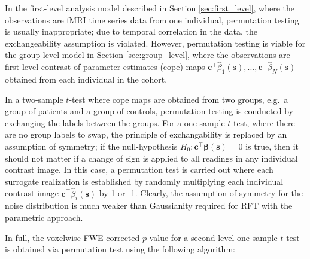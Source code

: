 In the first-level analysis model described in Section \ref{sec:first_level}, where the observations are fMRI time series data from one individual, permutation testing is usually inappropriate; due to temporal correlation in the data, the exchangeability assumption is violated. However, permutation testing is viable for the group-level model in Section \ref{sec:group_level}, where the observations are first-level contrast of parameter estimates (cope) maps $\bm{c}^{\intercal}\hat{\beta}_{1}(\bm{s}), ..., \bm{c}^{\intercal}\hat{\beta}_{N}(\bm{s})$ obtained from each individual in the cohort.

In a two-sample $t$-test where cope maps are obtained from two groups, e.g.\ a group of patients and a group of controls, permutation testing is conducted by exchanging the labels between the groups. For a one-sample $t$-test, where there are no group labels to swap, the principle of exchangability is replaced by an assumption of symmetry; if the null-hypothesis $H_{0} : \bm{c}^{\intercal}\bm{\beta}(\bm{s}) = 0$ is true, then it should not matter if a change of sign is applied to all readings in any individual contrast image. In this case, a permutation test is carried out where each surrogate realization is established by randomly multiplying each individual contrast image $\bm{c}^{\intercal}\hat{\beta}_{i}(\bm{s})$ by 1 or -1. Clearly, the assumption of symmetry for the noise distribution is much weaker than Gaussianity required for RFT with the parametric approach.

In full, the voxelwise FWE-corrected $p$-value for a second-level one-sample $t$-test is obtained via permutation test using the following algorithm: 

